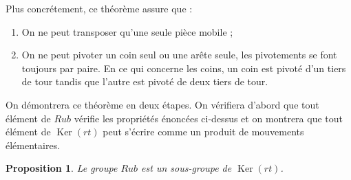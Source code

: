 \documentclass[french]{report}
\newtheorem{prop}{Proposition}[section]
\begin{document}
Plus concrétement, ce théorème assure que :

\begin{enumerate}
  \item On ne peut transposer qu'une seule pièce mobile ;
  \item On ne peut pivoter un coin seul ou une arête seule, les pivotements se font toujours par paire. En ce qui concerne les coins, un coin est pivoté d'un tiers de tour tandis que l'autre est pivoté de deux tiers de tour.
\end{enumerate}

On démontrera ce théorème en deux étapes. On vérifiera d'abord que tout élément de $Rub$ vérifie les propriétés énoncées ci-dessus et on montrera que tout élément de $\operatorname{Ker}(rt)$ peut s'écrire comme un produit de mouvements élémentaires.

\begin{prop}
  Le groupe $Rub$ est un sous-groupe de $\operatorname{Ker}(rt)$.
\end{prop}
\end{document}
